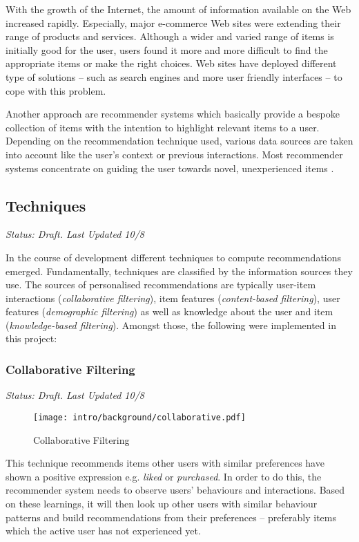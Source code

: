 With the growth of the Internet, the amount of information available on the Web increased rapidly. Especially, major e-commerce Web sites were extending their range of products and services. Although a wider and varied range of items is initially good for the user, users found it more and more difficult to find the appropriate items or make the right choices. Web sites have deployed different type of solutions -- such as search engines and more user friendly interfaces -- to cope with this problem.

Another approach are recommender systems which basically provide a bespoke collection of items with the intention to highlight relevant items to a user. Depending on the recommendation technique used, various data sources are taken into account like the user's context or previous interactions. Most recommender systems concentrate on guiding the user towards novel, unexperienced items \cite{herlocker04}.

\subsection{Techniques}

\emph{Status: Draft. Last Updated 10/8}

In the course of development different techniques to compute recommendations emerged. Fundamentally, techniques are classified by the information sources they use. The sources of personalised recommendations are typically user-item interactions (\emph{collaborative filtering}), item features (\emph{content-based filtering}), user features (\emph{demographic filtering}) as well as knowledge about the user and item (\emph{knowledge-based filtering}). Amongst those, the following were implemented in this project:

\subsubsection{Collaborative Filtering}
\label{intro-bg-tech-collaborative}

\emph{Status: Draft. Last Updated 10/8}

\begin{figure}[ht]
    \texttt{[image: intro/background/collaborative.pdf]}
    \caption{Collaborative Filtering}
    \label{fig:collaborative}
\end{figure}

This technique recommends items other users with similar preferences have shown a positive expression e.g. \emph{liked} or \emph{purchased}. In order to do this, the recommender system needs to observe users' behaviours and interactions. Based on these learnings, it will then look up other users with similar behaviour patterns and build recommendations from their preferences -- preferably items which the active user has not experienced yet.

